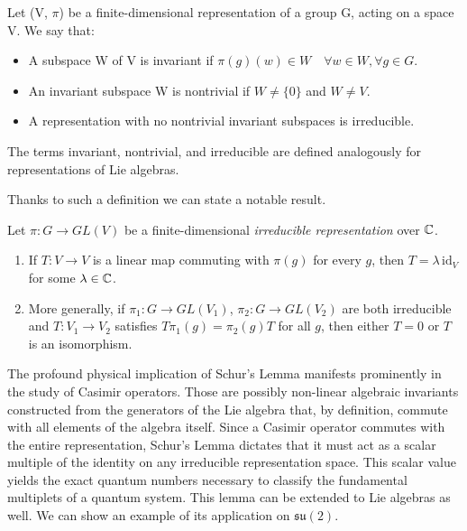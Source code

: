 \begin{definition} \label{def:rep-irreps}
	Let (V, $\pi$) be a finite-dimensional representation of a group G, acting on a space V. 
	We say that:
	\begin{itemize}
	 \item A subspace W of V is invariant if $\pi(g)(w) \in W \quad \forall w \in W , \forall g \in G$. 
	 \item An invariant subspace W is nontrivial if $W \neq \{0\}$ and $W \neq V$. 
	 \item A representation with no nontrivial invariant subspaces is irreducible.
	\end{itemize}
	The terms invariant, nontrivial, and irreducible are defined analogously for representations of Lie algebras.
\end{definition}

\noindent Thanks to such a definition we can state a notable result.

\begin{lemma}\label{lem:schur}
	Let $\pi: G \to GL(V)$ be a finite-dimensional \emph{irreducible representation}  over $\mathbb{C}$.
	\begin{enumerate}
		\item If $T: V \to V$ is a linear map commuting with $\pi(g)$ for every $g$, then $T = \lambda \, \mathrm{id}_V$ for some $\lambda \in \mathbb{C}$.
		\item More generally, if $\pi_1: G\to GL(V_1)$, $\pi_2: G\to GL(V_2)$ are both irreducible and $T: V_1 \to V_2$ satisfies $T\pi_1(g) = \pi_2(g)T$ for all $g$, then either $T=0$ or $T$ is an isomorphism.
	\end{enumerate}
\end{lemma}

The profound physical implication of Schur's Lemma manifests prominently in the study of Casimir operators. Those are possibly non-linear algebraic invariants constructed from the generators of the Lie algebra that, by definition, commute with all elements of the algebra itself. Since a Casimir operator commutes with the entire representation, Schur's Lemma dictates that it must act as a scalar multiple of the identity on any irreducible representation space. This scalar value yields the exact quantum numbers necessary to classify the fundamental multiplets of a quantum system. This lemma can be extended to Lie algebras as well. We can show an example of its application on $\mathfrak{su}(2)$.

